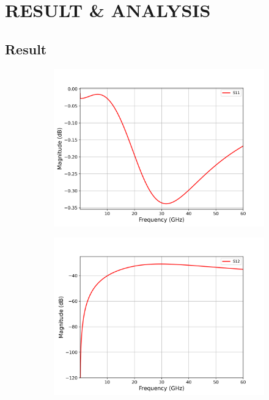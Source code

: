 \chapter{RESULT \& ANALYSIS}
\section{Result}
 \begin{figure}[H]
  \centering
  \begin{subfigure}{0.49\textwidth}
    \centering
    \includegraphics[width=\linewidth]{figures/single_stage_s11.png}
    \caption{}
    \label{fig:single-stage-without-cadence-s11}
  \end{subfigure}
  \hfill
  \begin{subfigure}{0.49\textwidth}
    \centering
    \includegraphics[width=\linewidth]{figures/single_stage_s12.png}

\end{subfigure}
\end{figure}
